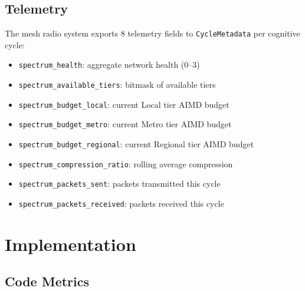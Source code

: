 \documentclass[11pt,twocolumn]{article}
\begin{document}
\subsection{Telemetry}

The mesh radio system exports 8 telemetry fields to \texttt{CycleMetadata}
per cognitive cycle:

\begin{itemize}[nosep]
  \item \texttt{spectrum\_health}: aggregate network health (0--3)
  \item \texttt{spectrum\_available\_tiers}: bitmask of available tiers
  \item \texttt{spectrum\_budget\_local}: current Local tier AIMD budget
  \item \texttt{spectrum\_budget\_metro}: current Metro tier AIMD budget
  \item \texttt{spectrum\_budget\_regional}: current Regional tier AIMD budget
  \item \texttt{spectrum\_compression\_ratio}: rolling average compression
  \item \texttt{spectrum\_packets\_sent}: packets transmitted this cycle
  \item \texttt{spectrum\_packets\_received}: packets received this cycle
\end{itemize}

\section{Implementation}

\subsection{Code Metrics}
\end{document}

